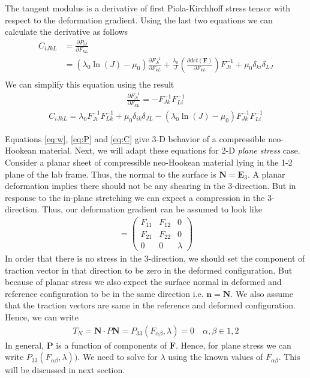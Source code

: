 \message{ !name(p2.tex)}\documentclass[../main.tex]{subfiles}
\begin{document}
The tangent modulus is a derivative of first Piola-Kirchhoff stress
tensor with respect to the deformation gradient. Using the last two
equations we can calculate the derivative as follows
\begin{align*}
  C_{iJkL}&=\frac{\partial P_{iJ}}{\partial F_{kL}}\\
          &= \left(\lambda_0\ln(J) - \mu_0\right)\frac{\partial F^{-1}_{Ji}}{\partial F_{kL}} + \frac{\lambda_0}{J}\left(\frac{\partial det(\mathbf{F})}{\partial F_{kL}}\right)F^{-1}_{Ji} + \mu_0\delta_{ki}\delta_{LJ}\\
\end{align*}
We can simplify this equation using the result
\begin{align*}
  \frac{\partial F^{-1}_{Ji}}{\partial F_{kL}} = -F^{-1}_{Jk}F^{-1}_{Li}
\end{align*}
\begin{align}
  \label{eq:C}
  \boxed{C_{iJkL}=\lambda_0F^{-1}_{Ji}F^{-1}_{Lk} + \mu_0\delta_{ik}\delta_{JL}-(\lambda_0\ln(J) - \mu_0)F^{-1}_{Jk}F^{-1}_{Li}}
\end{align}

Equations \ref{eq:w}, \ref{eq:P} and \ref{eq:C} give 3-D behavior of a
compressible neo-Hookean material. Next, we will adapt these equations
for 2-D \textit{plane stress} case. Consider a planar sheet of
compressible neo-Hookean material lying in the 1-2 plane of the lab
frame. Thus, the normal to the surface is $\bm{N} = \bm{E}_3$.  A
planar deformation implies there should not be any shearing in the
3-direction. But in response to the in-plane stretching we can expect
a compression in the 3-direction. Thus, our deformation gradient can
be assumed to look like
\begin{align*}
  [F_{iJ}] =
  \begin{pmatrix}
    F_{11} & F_{12} & 0\\
    F_{21} & F_{22} & 0\\
    0 & 0 & \lambda
  \end{pmatrix}
\end{align*}
In order that there is no stress in the 3-direction, we should set the
component of traction vector in that direction to be zero in the
deformed configuration. But because of planar stress we also expect
the surface normal in deformed and reference configuration to be in
the same direction i.e. $\bm{n} = \bm{N}$. We also assume that the
traction vectors are same in the reference and deformed
configuration. Hence, we can write
\begin{align}
  \label{eq:planeStress}
  T_N = \bm{N}\cdot P\bm{N} = P_{33}(F_{\alpha\beta},\lambda) = 0 \quad \alpha,\beta\in{1,2}
\end{align}
In general, $\mathbf{P}$ is a function of components of
$\mathbf{F}$. Hence, for plane stress we can write
$P_{33}(F_{\alpha\beta},\lambda))$. We need to solve for $\lambda$
using the known values of $F_{\alpha\beta}$. This will be discussed in
next section.
\end{document}
